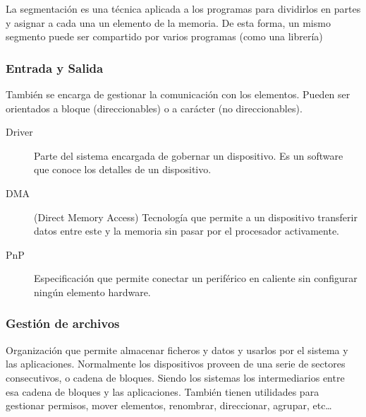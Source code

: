 La segmentación es una técnica aplicada a los programas para dividirlos en partes y asignar a cada una un elemento de la memoria. De esta forma, un mismo segmento puede ser compartido por varios programas (como una librería)

\subsubsection{Entrada y Salida}

También se encarga de gestionar la comunicación con los elementos. Pueden ser orientados a bloque (direccionables) o a carácter (no direccionables). 

\begin{description}
    \item[Driver] Parte del sistema encargada de gobernar un dispositivo. Es un software que conoce los detalles de un dispositivo.
    \item[DMA] (Direct Memory Access) Tecnología que permite a un dispositivo transferir datos entre este y la memoria sin pasar por el procesador activamente.
    \item[PnP] Especificación que permite conectar un periférico en caliente sin configurar ningún elemento hardware.
\end{description}

\subsubsection{Gestión de archivos}

Organización que permite almacenar ficheros y datos y usarlos por el sistema y las aplicaciones. Normalmente los dispositivos proveen de una serie de sectores consecutivos, o cadena de bloques. Siendo los sistemas los intermediarios entre esa cadena de bloques y las aplicaciones. También tienen utilidades para gestionar permisos, mover elementos, renombrar, direccionar, agrupar, etc\dots

